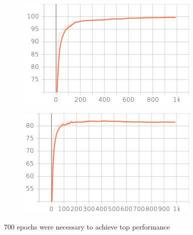\documentclass{article}
\begin{document}
\begin{figure}
\centering
\begin{minipage}{.5\textwidth}
  \centering
  \includegraphics[width=.9\linewidth]{result_files/train_accuracy.png}
  \label{fig:test1}
\end{minipage}%
\begin{minipage}{.5\textwidth}
  \centering
  \includegraphics[width=.9\linewidth]{result_files/test_accuracy.png}
  \label{fig:test2}
\end{minipage}
\end{figure}

700 epochs were necessary to achieve top performance
\end{document}
